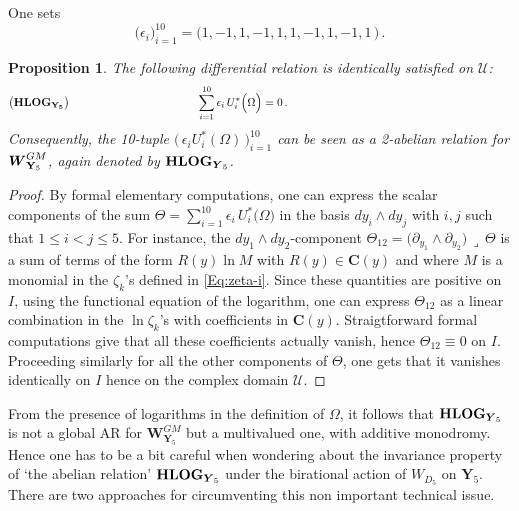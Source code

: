 \documentclass[11pt]{amsart}
\newcommand{\sk}{\smallskip}
\newtheorem{prop}[thm]{Proposition}
\begin{document}
One sets 
\begin{equation}
\label{Eq:epsilon}
\big(\epsilon_i\big)_{i=1}^{10}=\big(1, -1, 1, -1, 1, 1, -1, 1, -1, 1\,\big)\, .
\end{equation}

\begin{prop}
\label{Eq:AR-HLOG-Y5}
The following differential relation is identically satisfied on $\mathcal U$: 
$$
\boldsymbol{\big( {\bf HLOG}_{ {\bf Y}_5}\big)}
\hspace{4cm}
\sum_{i=1}^{10} 
 \epsilon_i\,U_{i}^*\Big( \Omega \Big)=0\, .
\hspace{7cm} {}^{} 
%
%
%
%
$$
Consequently,  the 10-tuple  $\big( \,\epsilon_i U_{i}^*(\Omega )\, \big)_{i=1}^{10}$ can be seen as a  2-abelian relation for $\boldsymbol{W}^{GM}_{{\bf Y}_5}$, again denoted by $ {\bf HLOG}_{ \boldsymbol{Y}_5}$. \sk 
\end{prop}
\begin{proof}%
 By formal elementary computations, one can express the scalar components of the sum $\Theta=\sum_{i=1}^{10} 
  \epsilon_i\, U_{i}^*\big( \Omega \big)$ in the basis $dy_i\wedge dy_j$ with $i,j$ such that $1\leq i<j\leq 5$. For instance, the $dy_1\wedge dy_2$-component 
 $\Theta_{12}=\big( \partial_{y_1}\wedge \partial_{y_2} \big)\, \lrcorner \, \Theta$
 is  a sum of terms of the form $R(y) \ln M$ with $R(y)\in \mathbf C(y)$ and where $M$ is a monomial in the $\zeta_k$'s defined in \eqref{Eq:zeta-i}. Since these quantities are positive on $I$, using the functional equation of the logarithm, one can express  $\Theta_{12}$ as a linear combination in the $\ln \zeta_k$'s with coefficients in $\mathbf C(y)$. Straigtforward formal computations give that all these coefficients actually vanish, hence $\Theta_{12}\equiv 0$ on $I$.  Proceeding similarly for all the other components of $\Theta$, one gets that it vanishes identically on $I$ hence on the complex domain $\mathcal U$.
\end{proof}%



From the presence of logarithms in the definition of $\Omega$, it follows that  $ {\bf HLOG}_{ \boldsymbol{Y}_5}$ is not a global AR for $\boldsymbol{W}^{GM}_{\boldsymbol{Y}_5}$ but a multivalued one, with additive monodromy.  Hence  one has to be a bit careful when wondering about the invariance property of `the abelian relation' $ {\bf HLOG}_{ \boldsymbol{Y}_5}$ under the 
birational action of $W_{D_5}$ on $\boldsymbol{Y}_5$.  There are two approaches for circumventing this non important technical issue. 
\sk
\end{document}
